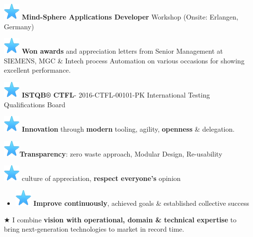 \documentclass[]{cv-class}
\begin{document}
        \item {\includegraphics[scale=0.30]{img/star.png}}{\textbf{ Mind-Sphere Applications Developer }Workshop (Onsite: Erlangen, Germany) }
        \item {\includegraphics[scale=0.30]{img/star.png}} \textbf{Won awards} and appreciation letters from Senior Management at SIEMENS, MGC \& Intech process Automation on various occasions for showing excellent performance.
        \item {\includegraphics[scale=0.30]{img/star.png}}{\textbf{ ISTQB® CTFL}- 2016-CTFL-00101-PK International Testing Qualifications Board}
        \item {\includegraphics[scale=0.30]{img/star.png}} \textbf{Innovation} through \textbf{modern} tooling, agility, \textbf{openness} \& delegation.
        \item {\includegraphics[scale=0.30]{img/star.png}}\textbf{Transparency}: zero waste approach, Modular Design, Re-usability
        \item {\includegraphics[scale=0.30]{img/star.png}} culture of appreciation, \textbf{respect everyone's} opinion
        \begin{itemize}
            \item {\includegraphics[scale=0.30]{img/star.png}} \textbf{Improve continuously}, achieved goals \& established collective success
        \end{itemize}
          \textbf{$\bigstar$}  I combine \textbf{vision with operational, domain \& technical expertise}  to bring next-generation technologies to market in record time.\\
 \vspace{1mm}
\end{document}
